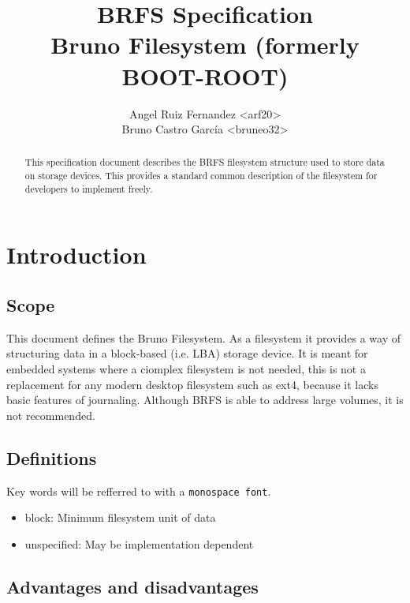 \documentclass[]{article}
\title{
	\textbf{BRFS Specification} \\
	\large Bruno Filesystem (formerly BOOT-ROOT)
}
\author{
	Angel Ruiz Fernandez \textless arf20\textgreater \\
	Bruno Castro García  \textless bruneo32\textgreater
}
\begin{document}
	\maketitle
	\thispagestyle{fancy}
	
	\begin{abstract}
		This specification document describes the BRFS filesystem structure used to store data on storage devices. This provides a standard common description of the filesystem for developers to implement freely.
	\end{abstract}

	\begin{versionhistory}
	\end{versionhistory}

	\pagebreak
	
	\tableofcontents
	\pagebreak
	
	\section{Introduction}
	\subsection{Scope}
	
	This document defines the Bruno Filesystem. As a filesystem it provides a way of structuring data in a block-based (i.e. LBA) storage device. It is meant for embedded systems where a ciomplex filesystem is not needed, this is not a replacement for any modern desktop filesystem such as ext4, because it lacks basic features of journaling. Although BRFS is able to address large volumes, it is not recommended.
	
	\subsection{Definitions}
	
	Key words will be refferred to with a \texttt{monospace font}.
	
	\begin{itemize}
		\item block: Minimum filesystem unit of data
		\item unspecified: May be implementation dependent
	\end{itemize}
	
	\subsection{Advantages and disadvantages}
	
\end{document}
